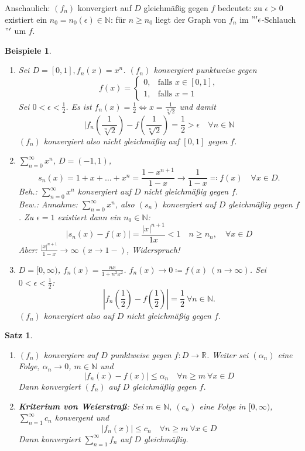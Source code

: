 \documentclass[14pt,titlepage,ngerman,a4paper,headsepline,DIV15,halfparskip*]{scrartcl}
\newcommand{\N}{\mathbb{N}}
\newcommand{\R}{\mathbb{R}}
\theoremstyle{named}
\theoremstyle{dotless}
\newtheorem{satz}[namedtheorem]{Satz}
\newtheorem*{beispiele}{Beispiele}
\begin{document}
Anschaulich: $(f_{n})$ konvergiert auf $D$ gleichmä{\ss}ig gegen $f$ bedeutet: zu $\epsilon > 0$ existiert ein $n_{0} = n_{0}(\epsilon) \in \N$: für $n \geq n_{0}$ liegt der Graph von $f_{n}$ im $"'\epsilon$-Schlauch$"'$ um $f$.

\begin{beispiele} ~\
	\begin{enumerate}
		\item Sei $D = [0, 1], f_{n}(x) = x^{n}$. $(f_{n})$ konvergiert punktweise gegen 
			$$ f(x) = \begin{cases} 0, & \text{falls } x \in [0, 1], \\ 1, & \text{falls } x = 1 \end{cases} $$
			Sei $0 < \epsilon < \frac{1}{2}$. Es ist $f_{n}(x) = \frac{1}{2} \iff x = \frac{1}{\sqrt[n]{2}}$ und damit
				$$ |f_{n}(\frac{1}{\sqrt[n]{2}}) - f(\frac{1}{\sqrt[n]{2}}) = \frac{1}{2} > \epsilon \quad \forall n \in \N $$
			$(f_{n})$ konvergiert also nicht gleichmä{\ss}ig auf $[0, 1]$ gegen $f$.
		\item $\sum_{n=0}^{\infty} x^{n}$, $D = (-1, 1)$, 
			$$ s_{n}(x) = 1 + x + \dotsc + x^{n} = \frac{1 - x^{n+1}}{1 - x} \rightarrow \frac{1}{1 - x} \eqqcolon f(x) \quad \forall x \in D. $$
			Beh.: $\sum_{n=0}^{\infty} x^{n}$ konvergiert auf $D$ nicht gleichmä{\ss}ig gegen $f$. \\
			Bew.: Annahme: $\sum_{n=0}^{\infty} x^{n}$, also $(s_{n})$ konvergiert auf $D$ gleichmä{\ss}ig gegen $f$. Zu $\epsilon = 1$ existiert dann ein $n_{0} \in \N$:
			$$ | s_{n}(x) - f(x) | = \frac{|x|^{n+1}}{1  x} < 1 \quad n \geq n_{n}, \quad \forall x \in D $$
			Aber: $\frac{|x|^{n+1}}{1 - x} \rightarrow \infty ~(x \rightarrow 1-)$, Widerspruch!
		\item $D = [0, \infty)$, $f_{n}(x) = \frac{nx}{1 + n^{2} x^{2}}$. $f_{n}(x) \rightarrow 0 \coloneqq f(x) ~(n \rightarrow \infty)$. Sei $0 < \epsilon < \frac{1}{2}$: 
			$$ |f_{n}(\frac{1}{2}) - f(\frac{1}{2})| = \frac{1}{2} ~\forall n \in \N. $$
			$(f_{n})$ konvergiert also auf $D$ nicht gleichmäßig gegen $f$.
	\end{enumerate}	
\end{beispiele}

\begin{satz} ~\ \label{8.1:satz}
	\begin{enumerate}
		\item $(f_{n})$ konvergiere auf $D$ punktweise gegen $f \colon D \rightarrow \R$. Weiter sei $(\alpha_{n})$ eine Folge, $\alpha_{n} \rightarrow 0$, $m \in \N$ und
			$$ |f_{n}(x) - f(x) | \leq \alpha_{n} \quad \forall n \geq m ~\forall x \in D $$
			Dann konvergiert $(f_{n})$ auf $D$ gleichmä{\ss}ig gegen $f$. \label{8.1.a:satz}
		\item \textbf{Kriterium von Weierstra{\ss}}: Sei $m \in \N$, $(c_{n})$ eine Folge in $[0, \infty)$, $\sum_{n=1}^{\infty} c_{n}$ konvergent und
			$$ | f_{n}(x) | \leq c_{n} \quad \forall n \geq m ~\forall x \in D $$
			Dann konvergiert $\sum_{n=1}^{\infty} f_{n}$ auf $D$ gleichmä{\ss}ig. \label{8.1.b:satz}
	\end{enumerate}
\end{satz}
\end{document}
